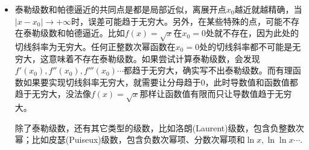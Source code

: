 \begin{itemize}[leftmargin=\inteval{\myitemleftmargin}pt,itemsep=
   \inteval{\myitemitempsep}pt,topsep=\inteval{\myitemtopsep}pt]
\item 泰勒级数和帕德逼近的共同点是都是局部近似，离展开点$ x_0 $越近就越精确，当$ |x-x_0|\to+\infty $时，误差可能趋于无穷大。另外，在某些特殊的点，可能不存在泰勒级数和帕德逼近。比如$ f(x)=\sqrt{x} $在$ x_0=0 $处就不存在，因为此处的切线斜率为无穷大。任何正整数次幂函数在$ x_0=0 $处的切线斜率都不可能是无穷大，这意味着不存在泰勒级数。如果尝试计算泰勒级数，会发现$ f'(x_0),f''(x_0),f'''(x_0)\cdots $都趋于无穷大，确实写不出泰勒级数。而有理函数如果要实现切线斜率无穷大，就需要让分母趋于0，此时导数值和函数值都趋于无穷大，没法像$ f(x)=\sqrt{x} $那样让函数值有限而只让导数值趋于无穷大。

除了泰勒级数，还有其它类型的级数，比如洛朗(Laurent)级数，包含负整数次幂；比如皮瑟(Puiseux)级数，包含负数次幂项、分数次幂项和$ \ln x,\ln\ln x\cdots $.


\end{itemize}

